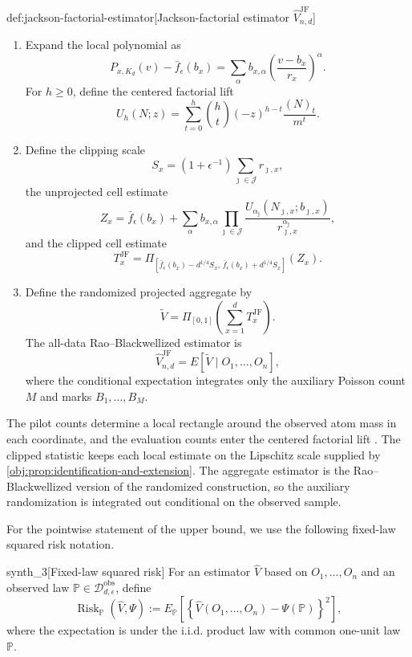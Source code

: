 \begin{algorithmv}{def:jackson-factorial-estimator}[Jackson-factorial estimator \(\widehat V_{n,d}^{\mathrm{JF}}\)]
\begin{enumerate}
\item Expand the local polynomial as
\[
P_{x,K_d}(v)-\bar f_\epsilon(b_x)
=
\sum_\alpha
b_{x,\alpha}
\left(\frac{v-b_x}{r_x}\right)^\alpha .
\]
For \(h\ge 0\), define the centered factorial lift
\[
U_h(N;z)
=
\sum_{t=0}^h
\binom ht
(-z)^{h-t}
\frac{(N)_t}{m^t}.
\]

\item Define the clipping scale
\[
S_x
=
(1+\epsilon^{-1})
\sum_{\jmath\in\mathcal J} r_{\jmath,x},
\]
the unprojected cell estimate
\[
Z_x
=
\bar f_\epsilon(b_x)
+
\sum_\alpha
b_{x,\alpha}
\prod_{\jmath\in\mathcal J}
\frac{
U_{\alpha_{\jmath}}(N_{\jmath,x};b_{\jmath,x})
}{
r_{\jmath,x}^{\alpha_{\jmath}}
},
\]
and the clipped cell estimate
\[
T_x^{\mathrm{JF}}
=
\Pi_{
[\bar f_\epsilon(b_x)-d^{1/4}S_x,\,
 \bar f_\epsilon(b_x)+d^{1/4}S_x]
}
(Z_x).
\]

\item Define the randomized projected aggregate by
\[
\widetilde V
=
\Pi_{[0,1]}
\left(
\sum_{x=1}^d T_x^{\mathrm{JF}}
\right).
\]
The all-data Rao--Blackwellized estimator is
\[
\widehat V_{n,d}^{\mathrm{JF}}
=
E\!\left[
\widetilde V
\mid
O_1,\ldots,O_n
\right],
\]
where the conditional expectation integrates only the auxiliary Poisson count \(M\) and marks \(B_1,\ldots,B_M\).
\end{enumerate}
\end{algorithmv}

The pilot counts  determine a local rectangle around the observed atom mass in each coordinate, and the evaluation counts  enter the centered factorial lift . The clipped statistic  keeps each local estimate on the Lipschitz scale supplied by \cref{obj:prop:identification-and-extension}. The aggregate estimator  is the Rao--Blackwellized version of the randomized construction, so the auxiliary randomization is integrated out conditional on the observed sample.

For the pointwise statement of the upper bound, we use the following fixed-law squared risk notation.

\begin{definitionv}{synth_3}[Fixed-law squared risk]
For an estimator \(\widehat V\) based on \(O_1,\ldots,O_n\) and an observed law \(\mathbb P\in\mathcal D_{d,\epsilon}^{\mathrm{obs}}\), define \[ \operatorname{Risk}_{\mathbb P}(\widehat V,\Psi):=E_{\mathbb P}\left[\left\{\widehat V(O_1,\ldots,O_n)-\Psi(\mathbb P)\right\}^2\right], \] where the expectation is under the i.i.d. product law with common one-unit law \(\mathbb P\).
\end{definitionv}

